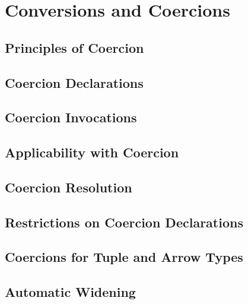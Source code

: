 %
%
%
%

\chapter{Conversions and Coercions}

\section{Principles of Coercion}
\section{Coercion Declarations}
\section{Coercion Invocations}
\section{Applicability with Coercion}
\section{Coercion Resolution}
\section{Restrictions on Coercion Declarations}
\section{Coercions for Tuple and Arrow Types}
\section{Automatic Widening}
